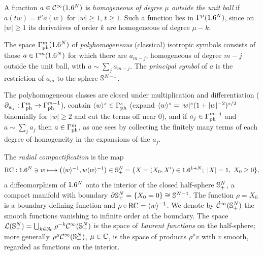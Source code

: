 A function $a\in\mathcal{C}^\infty(1.6^N)$ is \emph{homogeneous of degree $\mu$ outside the
unit ball} if $a(tw)=t^\mu a(w)$ for $|w|\ge1$, $t\ge1$. Such a function lies in
$\Gamma^{\mu}(1.6^N)$, since on $|w|\ge1$ its derivatives of order $k$ are
homogeneous of degree $\mu-k$.

\begin{definition}\label{isotropic:def:Gph}
The space $\Gamma^{m}_{\mathrm{ph}}(1.6^N)$ of \emph{polyhomogeneous} (classical) isotropic
symbols consists of those $a\in\Gamma^{m}(1.6^N)$ for which there are $a_{m-j}$,
homogeneous of degree $m-j$ outside the unit ball, with $a\sim\sum_ja_{m-j}$.
The \emph{principal symbol} of $a$ is the restriction of $a_m$ to the sphere
$\mathbb{S}^{N-1}$.
\end{definition}

The polyhomogeneous classes are closed under multiplication and
differentiation ($\partial_{w_j}:\Gamma^{m}_{\mathrm{ph}}\to\Gamma^{m-1}_{\mathrm{ph}}$), contain $\langle w\rangle^s\in\Gamma^{s}_{\mathrm{ph}}$
(expand $\langle w\rangle^s=|w|^s(1+|w|^{-2})^{s/2}$ binomially for $|w|\ge2$ and cut
the terms off near $0$), and if $a_j\in\Gamma^{m-j}_{\mathrm{ph}}$ and $a\sim\sum_ja_j$ then
$a\in\Gamma^{m}_{\mathrm{ph}}$, as one sees by collecting the finitely many terms of each
degree of homogeneity in the expansions of the $a_j$.

The \emph{radial compactification} is the map
\begin{equation*}
  \operatorname{RC}:1.6^N\ni w\longmapsto\bigl(\langle w\rangle^{-1},w\langle w\rangle^{-1}\bigr)\in
  \mathbb{S}^{N}_{+}=\{X=(X_0,X')\in1.6^{1+N};\ |X|=1,\ X_0\ge0\},
\end{equation*}
a diffeomorphism of $1.6^N$ onto the interior of the closed half-sphere
$\mathbb{S}^{N}_{+}$, a compact manifold with boundary
$\partial\mathbb{S}^{N}_{+}=\{X_0=0\}\cong\mathbb{S}^{N-1}$. The function $\rho=X_0$ is a
boundary defining function and $\rho\circ\operatorname{RC}=\langle w\rangle^{-1}$. We denote by
$\dot{\mathcal{C}}^\infty(\mathbb{S}^{N}_{+})$ the smooth functions vanishing to infinite order at the
boundary. The space $\mathcal L(\mathbb{S}^{N}_{+})=\bigcup_{k\in\mathbb{N}_0}\rho^{-k}\mathcal{C}^\infty(\mathbb{S}^{N}_{+})$
is the space of \emph{Laurent functions} on the half-sphere; more generally
$\rho^{\mu}\mathcal{C}^\infty(\mathbb{S}^{N}_{+})$, $\mu\in\mathbb{C}$, is the space of products $\rho^\mu v$ with
$v$ smooth, regarded as functions on the interior.

